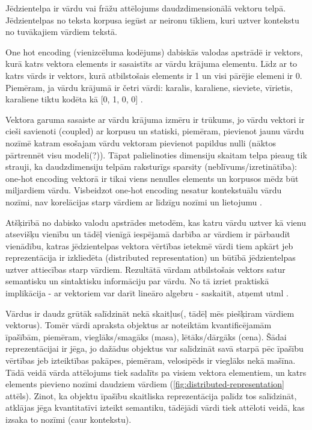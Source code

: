 Jēdzientelpa ir vārdu vai frāžu attēlojums daudzdimensionālā vektoru telpā. Jēdzientelpas no teksta korpusa iegūst ar neironu tīkliem, kuri uztver kontekstu no tuvākajiem vārdiem tekstā. 

One hot encoding (vienizcēluma kodējums) dabiskās valodas apstrādē ir vektors, kurā katrs vektora elements ir sasaistīts ar vārdu krājuma elementu. Līdz ar to katrs vārds ir vektors, kurā atbilstošais elements ir 1 un visi pārējie elemeni ir 0. Piemēram, ja vārdu krājumā ir četri vārdi: karalis, karaliene, sieviete, vīrietis, karaliene tiktu kodēta kā [0, 1, 0, 0] \cite{colyer2016}.

Vektora garuma sasaiste ar vārdu krājuma izmēru ir trūkums, jo vārdu vektori ir cieši savienoti (coupled) ar korpusu un statiski, piemēram, pievienot jaunu vārdu nozīmē katram esošajam vārdu vektoram pievienot papildus nulli (nāktos pārtrennēt visu modeli(?)). Tāpat palielinoties dimensiju skaitam telpa pieaug tik strauji, ka daudzdimensiju telpām raksturīgs sparsity (neblīvums/izretinātība): one-hot encoding vektorā ir tikai viens nenulles elements un korpusos mēdz būt miljardiem vārdu. Visbeidzot one-hot encoding nesatur kontekstuālu vārdu nozīmi, nav korelācijas starp vārdiem ar līdzīgu nozīmi un lietojumu \cite{colyer2016}.


Atšķirībā no dabisko valodu apstrādes metodēm, kas katru vārdu uztver kā vienu atsevišķu vienību un tādēļ vienīgā iespējamā darbība ar vārdiem ir pārbaudīt vienādību, katras jēdzientelpas vektora vērtības ietekmē vārdi tiem apkārt jeb reprezentācija ir izkliedēta (distributed representation) un būtībā jēdzientelpas uztver attiecības starp vārdiem. Rezultātā vārdam atbilstošais vektors satur semantisku un sintaktisku informāciju par vārdu. No tā izriet praktiskā implikācija - ar vektoriem var darīt lineāro algebru - saskaitīt, atņemt utml \cite{colyer2016}.

Vārdus ir daudz grūtāk salīdzināt nekā skaitļus(, tādēļ mēs piešķiram vārdiem vektorus). Tomēr vārdi apraksta objektus ar noteiktām kvantificējamām īpašībām, piemēram, vieglāks/smagāks (masa), lētāks/dārgāks (cena). Šādai reprezentācijai ir jēga, jo dažādus objektus var salīdzināt savā starpā pēc īpašību vērtības jeb izteiktības pakāpes, piemēram, velosipēds ir vieglāks nekā mašīna. Tādā veidā vārda attēlojums tiek sadalīts pa visiem vektora elementiem, un katrs elements pievieno nozīmi daudziem vārdiem (\ref{fig:distributed-representation} attēls). Zinot, ka objektu īpašību skaitliska reprezentācija palīdz tos salīdzināt, atklājas jēga kvantitatīvi izteikt semantiku, tādējādi vārdi tiek attēloti veidā, kas izsaka to nozīmi (caur kontekstu). 

